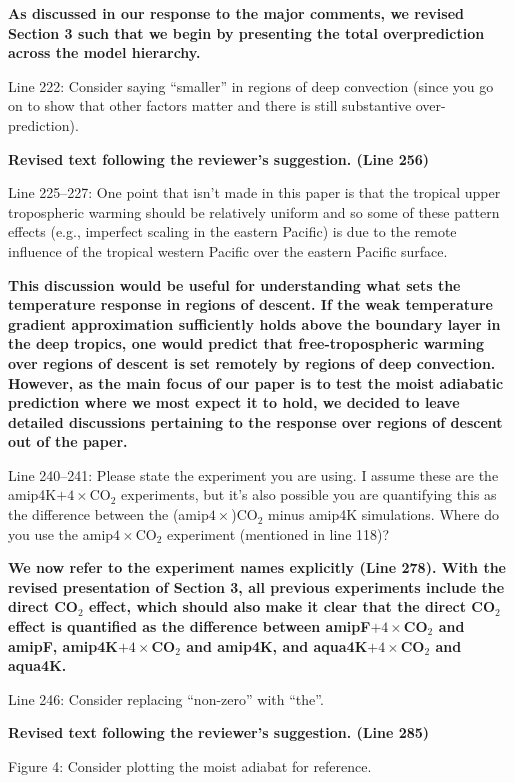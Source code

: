 \documentclass[11pt]{article}
\begin{document}
\textbf{As discussed in our response to the major comments, we revised Section 3 such that we begin by presenting the total overprediction across the model hierarchy.}

Line 222: Consider saying ``smaller'' in regions of deep convection (since you go on to show that other factors matter and there is still substantive over-prediction).

\textbf{Revised text following the reviewer's suggestion. (Line 256)}

Line 225--227: One point that isn't made in this paper is that the tropical upper tropospheric warming should be relatively uniform and so some of these pattern effects (e.g., imperfect scaling in the eastern Pacific) is due to the remote influence of the tropical western Pacific over the eastern Pacific surface.

\textbf{This discussion would be useful for understanding what sets the temperature response in regions of descent. If the weak temperature gradient approximation sufficiently holds above the boundary layer in the deep tropics, one would predict that free-tropospheric warming over regions of descent is set remotely by regions of deep convection. However, as the main focus of our paper is to test the moist adiabatic prediction where we most expect it to hold, we decided to leave detailed discussions pertaining to the response over regions of descent out of the paper.}

Line 240--241: Please state the experiment you are using. I assume these are the amip4K\(+4\times\)CO\(_2\) experiments, but it's also possible you are quantifying this as the difference between the (amip\(4\times\))CO\(_2\) minus amip4K simulations. Where do you use the amip\(4\times\)CO\(_2\) experiment (mentioned in line 118)?

\textbf{We now refer to the experiment names explicitly (Line 278). With the revised presentation of Section 3, all previous experiments include the direct CO\(_2\) effect, which should also make it clear that the direct CO\(_2\) effect is quantified as the difference between amipF\(+4\times\)CO\(_2\) and amipF, amip4K\(+4\times\)CO\(_2\) and amip4K, and aqua4K\(+4\times\)CO\(_2\) and aqua4K.}

Line 246: Consider replacing ``non-zero'' with ``the''.

\textbf{Revised text following the reviewer's suggestion. (Line 285)}

Figure 4: Consider plotting the moist adiabat for reference.
\end{document}
